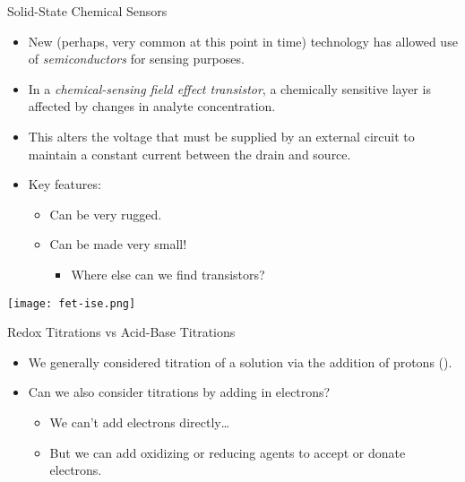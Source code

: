 \documentclass[notes=show]{beamer}
\begin{document}
\begin{frame}[allowframebreaks]{Solid-State Chemical Sensors}
	\begin{itemize}
		\item New (perhaps, very common at this point in time)
			technology has allowed use of \emph{semiconductors} for
			sensing purposes.
		\item In a \emph{chemical-sensing field effect transistor}, a
			chemically sensitive layer is affected by changes in
			analyte concentration.
		\item This alters the voltage that must be supplied by an
			external circuit to maintain a constant current between
			the drain and source.
		\item Key features:
			\begin{itemize}
				\item Can be very rugged.
				\item Can be made very small!
					\begin{itemize}
						\item Where else can we find
							transistors?
					\end{itemize}
			\end{itemize}
	\end{itemize}

	\framebreak

	\begin{center}
		\texttt{[image: fet-ise.png]}
	\end{center}
\end{frame}


\begin{frame}{Redox Titrations vs Acid-Base Titrations}
	\begin{itemize}[<+->]
		\item We generally considered titration of a solution via the
			addition of protons ().
		\item Can we also consider titrations by adding in electrons?
			\begin{itemize}
				\item We can't add electrons directly\ldots
				\item But we can add oxidizing or reducing
					agents to accept or donate electrons.
			\end{itemize}
	\end{itemize}
\end{frame}
\end{document}
